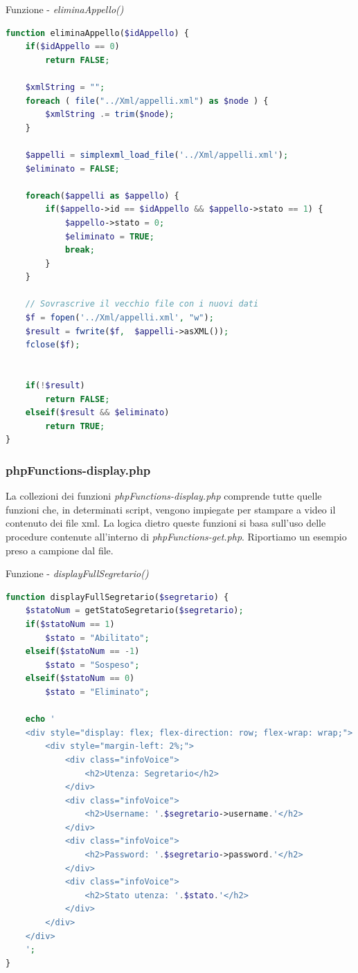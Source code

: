 \documentclass [a4paper,11pt]{book}
\begin{document}
\medskip


Funzione - \emph{eliminaAppello()} 

\medskip

\begin{lstlisting}[language=PHP]
function eliminaAppello($idAppello) {
    if($idAppello == 0)
        return FALSE;
    
    $xmlString = "";
    foreach ( file("../Xml/appelli.xml") as $node ) {
        $xmlString .= trim($node);
    }

    $appelli = simplexml_load_file('../Xml/appelli.xml');
    $eliminato = FALSE;

    foreach($appelli as $appello) {
        if($appello->id == $idAppello && $appello->stato == 1) {
            $appello->stato = 0;
            $eliminato = TRUE;
            break;
        }
    }

    // Sovrascrive il vecchio file con i nuovi dati
    $f = fopen('../Xml/appelli.xml', "w");
    $result = fwrite($f,  $appelli->asXML());
    fclose($f);


    if(!$result) 
        return FALSE;
    elseif($result && $eliminato)
        return TRUE;
}
\end{lstlisting}

\medskip

\subsubsection{phpFunctions-display.php}

La collezioni dei funzioni \emph{phpFunctions-display.php} comprende tutte quelle funzioni che, in determinati script, vengono impiegate per stampare a video il contenuto dei file xml. La logica dietro queste funzioni si basa sull'uso delle procedure contenute all'interno di \emph{phpFunctions-get.php}.
Riportiamo un esempio preso a campione dal file.


\medskip

Funzione - \emph{displayFullSegretario()} 

\medskip

\begin{lstlisting}[language=PHP]
function displayFullSegretario($segretario) {
    $statoNum = getStatoSegretario($segretario);
    if($statoNum == 1)
        $stato = "Abilitato";
    elseif($statoNum == -1)
        $stato = "Sospeso";
    elseif($statoNum == 0)
        $stato = "Eliminato";

    echo '
    <div style="display: flex; flex-direction: row; flex-wrap: wrap;">
        <div style="margin-left: 2%;">
            <div class="infoVoice">
                <h2>Utenza: Segretario</h2>
            </div>
            <div class="infoVoice">
                <h2>Username: '.$segretario->username.'</h2>
            </div>  
            <div class="infoVoice">
                <h2>Password: '.$segretario->password.'</h2>
            </div>  
            <div class="infoVoice">
                <h2>Stato utenza: '.$stato.'</h2>
            </div>
        </div>
    </div>
    ';
}
\end{lstlisting}
\end{document}
